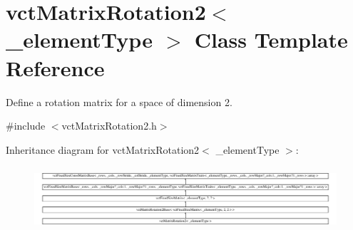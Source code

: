 \hypertarget{classvct_matrix_rotation2}{\section{vct\-Matrix\-Rotation2$<$ \-\_\-element\-Type $>$ Class Template Reference}
\label{classvct_matrix_rotation2}
}


Define a rotation matrix for a space of dimension 2.  




{\ttfamily \#include $<$vct\-Matrix\-Rotation2.\-h$>$}

Inheritance diagram for vct\-Matrix\-Rotation2$<$ \-\_\-element\-Type $>$\-:\begin{figure}[H]
\begin{center}
\leavevmode
\includegraphics[height=2.366864cm]{de/def/classvct_matrix_rotation2}
\end{center}
\end{figure}
